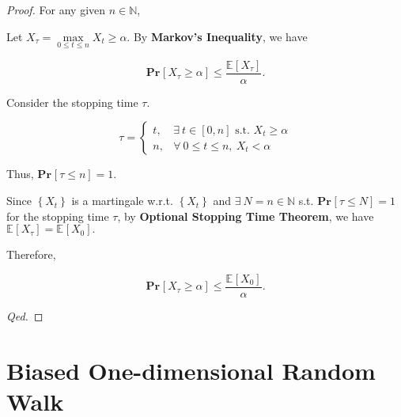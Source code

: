 \documentclass{article}
\renewcommand{\Pr}[2]{\mathbf{Pr}_{#1}\left[#2\right]}
\newcommand{\set}[1]{\left\{#1\right\}}
\newcommand{\staExp}[2]{\mathbb{E}_{#1}\left[#2\right]}
\begin{document}
\begin{proof}
    For any given $n\in\mathbb{N}$,
    
    \hspace{1.3em}
    Let $X_{\tau}=\underset{0\le t\le n}{\max}{X_t\geq\alpha}$. By \textbf{Markov's Inequality}, we have
    
    \vspace{-1em}
    $$\Pr{}{X_{\tau}\geq\alpha}\le\frac{\staExp{}{X_{\tau}}}{\alpha}.$$
    
    \vspace{-0.5em} \hspace{1.3em}
    Consider the stopping time $\tau$.
    
    \vspace{-1em}
    $$\tau=\left\{\begin{array}{ll}
        t, & \exists\ t\in [0,n]\text{ s.t. }X_t\geq\alpha  \\
        n, & \forall\ 0\le t\le n,\ X_t<\alpha
    \end{array}\right.$$
    
    \vspace{0.25em} \hspace{1.3em}
    Thus, $\Pr{}{\tau\le n}=1$.
    
    \hspace{1.3em}
    Since $\set{X_t}$ is a martingale w.r.t. $\set{X_t}$ and $\exists\ N=n\in\mathbb{N}$ s.t. $\Pr{}{\tau\le N}=1$ for the stopping time $\tau$, by \textbf{Optional Stopping Time Theorem}, we have $\staExp{}{X_{\tau}}=\staExp{}{X_0}.$
    
    \vspace{1em}
    \hspace{1.3em}
    Therefore, 
    
    \vspace{-1em}
    $$\Pr{}{X_{\tau}\geq\alpha}\le\frac{\staExp{}{X_0}}{\alpha}.$$
    
    \hspace{38em} \textit{Qed.}
\end{proof}

\newpage
\vspace{1em}
\section{Biased One-dimensional Random Walk}
\vspace{1em}
\end{document}
